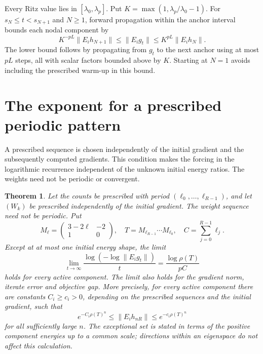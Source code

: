 \documentclass[11pt,a4paper]{article}
\newtheorem{theorem}{Theorem}
\numberwithin{equation}{section}
\newcommand{\norm}[1]{\lVert#1\rVert}
\begin{document}
Every Ritz value lies in \([\lambda_0,\lambda_p]\). Put \(K=\max(1,\lambda_p/\lambda_0-1)\). For \(s_N\le t<s_{N+1}\) and \(N\ge1\), forward propagation within the anchor interval bounds each nodal component by
\begin{equation}\label{eq:sandwich}
 K^{-pL}\norm{E_i h_{N+1}}\le\norm{E_i g_t}\le K^{pL}\norm{E_i h_N}.
\end{equation}
The lower bound follows by propagating from \(g_t\) to the next anchor using at most \(pL\) steps, all with scalar factors bounded above by \(K\). Starting at \(N=1\) avoids including the prescribed warm-up in this bound.

\section{The exponent for a prescribed periodic pattern}\label{sec:period}
A prescribed sequence is chosen independently of the initial gradient
and the subsequently computed gradients. This condition makes the
forcing in the logarithmic recurrence independent of the unknown
initial energy ratios. The weights need not be periodic or
convergent.

\begin{theorem}\label{thm:period}
Let the counts be prescribed with period \((\ell_0,\ldots,\ell_{R-1})\), and let \((W_k)\) be prescribed independently of the initial gradient. The weight sequence need not be periodic. Put
\[
 M_\ell=\begin{pmatrix}3-2\ell&-2\\1&0\end{pmatrix},\quad
 T=M_{\ell_{R-1}}\cdots M_{\ell_0},\quad
 C=\sum_{j=0}^{R-1}\ell_j.
\]
Except at at most one initial energy shape, the limit
\[
   \lim_{t\to\infty}\frac{\log(-\log\norm{E_i g_t})}{t}
       =\frac{\log\rho(T)}{pC}
\]
holds for every active component. The limit also holds for the gradient norm, iterate error and
objective gap. More precisely, for every active component there
are constants \(C_i\ge c_i>0\), depending on the prescribed sequences
and the initial gradient, such that
\[
 e^{-C_i\rho(T)^n}\le\|E_i h_{nR}\|
                     \le e^{-c_i\rho(T)^n}
\]
for all sufficiently large \(n\). The exceptional set is stated in
terms of the positive component energies up to a common scale;
directions within an eigenspace do not affect this calculation.
\end{theorem}
\end{document}
